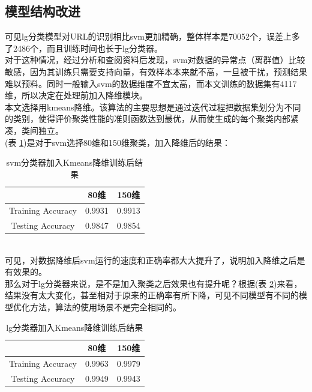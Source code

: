 \subsection{模型结构改进}
可见lg分类模型对URL的识别相比svm更加精确，整体样本是70052个，误差上多了2486个，而且训练时间也长于lg分类器。
\\\indent{}对于这种情况，经过分析和查阅资料后发现，svm对数据的异常点（离群值）比较敏感，因为其训练只需要支持向量，有效样本本来就不高，一旦被干扰，预测结果难以预料。同时一般输入svm的数据维度不宜太高，而本文训练的数据集有4117维，所以决定在处理前加入降维模块。 
\\\indent{}本文选择用kmeans降维。该算法的主要思想是通过迭代过程把数据集划分为不同的类别，使得评价聚类性能的准则函数达到最优，从而使生成的每个聚类内部紧凑，类间独立。 
\\\indent{}(表 \ref{table:svm_use})是对于svm选择80维和150维聚类，加入降维后的结果： 
\begin{table}[!ht]
    \setlength{\abovecaptionskip}{0.cm}
    \setlength{\belowcaptionskip}{-0.cm}
    \caption{svm分类器加入Kmeans降维训练后结果}
    \centering
    \label{table:svm_use}    
    \begin{tabular}{|c|c|c|}
        \hline
        &80维&150维\\
        \hline
        Training Accuracy&0.9931&0.9913\\
        \hline
        Testing Accuracy&0.9847&0.9854\\
        \hline
    \end{tabular}
\end{table}
\\\indent{}可见，对数据降维后svm运行的速度和正确率都大大提升了，说明加入降维之后是有效果的。
\\\indent{}那么对于lg分类器来说，是不是加入聚类之后效果也有提升呢？根据(表 \ref{table:lg_use})来看，结果没有太大变化，甚至相对于原来的正确率有所下降，可见不同模型有不同的模型优化方法，算法的使用场景不是完全相同的。
\begin{table}[!ht]
    \setlength{\abovecaptionskip}{0.cm}
    \setlength{\belowcaptionskip}{-0.cm}
    \caption{lg分类器加入Kmeans降维训练后结果}
    \centering
    \label{table:lg_use}    
    \begin{tabular}{|c|c|c|}
        \hline
        &80维&150维\\
        \hline
        Training Accuracy&0.9963&0.9979\\
        \hline
        Testing Accuracy&0.9949&0.9943\\
        \hline
    \end{tabular}
\end{table}